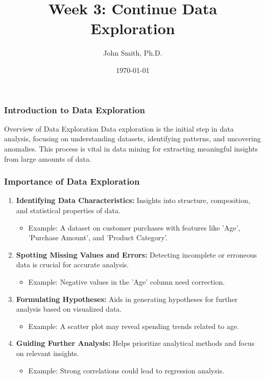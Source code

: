 \documentclass[aspectratio=169]{beamer}
\title[Week 3: Data Exploration]{Week 3: Continue Data Exploration}
\author[J. Smith]{John Smith, Ph.D.}
\institute[University Name]{
  Department of Computer Science\\
  University Name\\
  \vspace{0.3cm}
  Email: email@university.edu\\
  Website: www.university.edu
}
\date{\today}
\begin{document}
\frame{\titlepage}

\begin{frame}[fragile]
    \frametitle{Introduction to Data Exploration}
    \begin{block}{Overview of Data Exploration}
        Data exploration is the initial step in data analysis, focusing on understanding datasets, identifying patterns, and uncovering anomalies. This process is vital in data mining for extracting meaningful insights from large amounts of data.
    \end{block}
\end{frame}

\begin{frame}[fragile]
    \frametitle{Importance of Data Exploration}
    \begin{enumerate}
        \item \textbf{Identifying Data Characteristics:}
            Insights into structure, composition, and statistical properties of data.
            \begin{itemize}
                \item Example: A dataset on customer purchases with features like 'Age', 'Purchase Amount', and 'Product Category'.
            \end{itemize}

        \item \textbf{Spotting Missing Values and Errors:}
            Detecting incomplete or erroneous data is crucial for accurate analysis.
            \begin{itemize}
                \item Example: Negative values in the 'Age' column need correction.
            \end{itemize}

        \item \textbf{Formulating Hypotheses:}
            Aids in generating hypotheses for further analysis based on visualized data.
            \begin{itemize}
                \item Example: A scatter plot may reveal spending trends related to age.
            \end{itemize}
            
        \item \textbf{Guiding Further Analysis:}
            Helps prioritize analytical methods and focus on relevant insights.
            \begin{itemize}
                \item Example: Strong correlations could lead to regression analysis.
            \end{itemize}
    \end{enumerate}
\end{frame}
\end{document}
